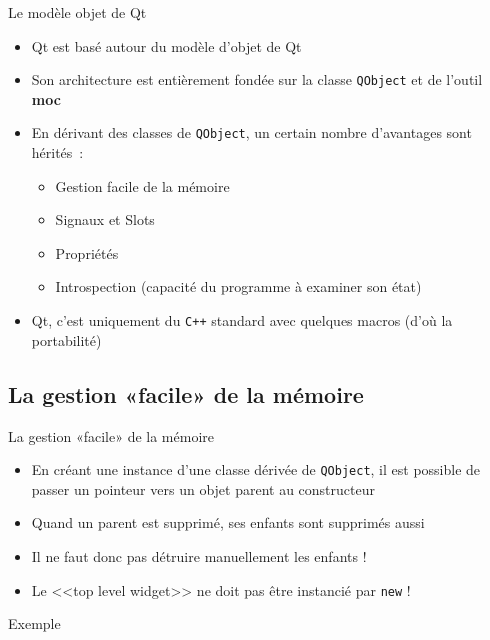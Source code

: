 \documentclass{beamer} %
\begin{document}
\begin{frame}{Le modèle objet de Qt}	
	\begin{itemize}
	\item Qt est basé autour du modèle d'objet de Qt
	\item<2-> Son architecture est entièrement fondée sur la classe \texttt{QObject} et de l'outil \textbf{moc}
	\item<3-> En dérivant des classes de \texttt{QObject}, un certain nombre d'avantages sont hérités~:
		\begin{itemize}
		\item<4-> Gestion facile de la mémoire
		\item<5-> Signaux et Slots
		\item<6-> Propriétés
		\item<7-> Introspection (capacité du programme à examiner son état)
		\end{itemize}
	\item<8-> Qt, c'est uniquement du \texttt{C++} standard avec quelques macros (d'où la portabilité)
	\end{itemize}
\end{frame}

\subsection{La gestion «facile» de la mémoire}
\begin{frame}{La gestion «facile» de la mémoire}
	
	\begin{itemize}
	\item En créant une instance d'une classe dérivée de \texttt{QObject}, il est possible de passer un pointeur vers un objet parent au constructeur
	\item<2-> Quand un parent est supprimé, ses enfants sont supprimés aussi
	\item<3-> \alert{Il ne faut donc pas détruire manuellement les enfants !}
	\item<4-> \alert{Le <<top level widget>> ne doit pas être instancié par \texttt{new} !}
	\end{itemize}
\end{frame}

\begin{frame}
	\begin{exampleblock}{Exemple}
		
	\end{exampleblock}
\end{frame}
\end{document}
